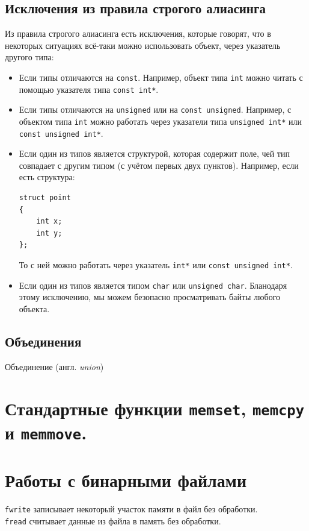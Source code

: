 \documentclass[10pt]{article}
\begin{document}
\subsection*{Исключения из правила строгого алиасинга}
Из правила строгого алиасинга есть исключения, которые говорят, что в некоторых ситуациях всё-таки можно использовать объект, через указатель другого типа:
\begin{itemize}
\item Если типы отличаются на \texttt{const}. Например, объект типа \texttt{int} можно читать с помощью указателя типа \texttt{const int*}. 

\item Если типы отличаются на \texttt{unsigned} или на \texttt{const unsigned}. Например, с объектом типа \texttt{int} можно работать через указатели типа \texttt{unsigned int*} или \texttt{const unsigned int*}. 

\item Если один из типов является структурой, которая содержит поле, чей тип совпадает с другим типом (с учётом первых двух пунктов). Например, если есть структура:
 \begin{lstlisting}
struct point
{
	int x;
	int y;
};
\end{lstlisting}
То с ней можно работать через указатель \texttt{int*} или \texttt{const unsigned int*}.

\item Если один из типов является типом \texttt{char} или \texttt{unsigned char}. Бланодаря этому исключению, мы можем безопасно просматривать байты любого объекта.
\end{itemize}

\subsection*{Объединения}
Объединение (англ. \textit{union})


\newpage
\section*{Стандартные функции \texttt{memset}, \texttt{memcpy} и \texttt{memmove}.}




\newpage
\section*{Работы с бинарными файлами}
\texttt{fwrite} записывает некоторый участок памяти в файл без обработки. \\
\texttt{fread} считывает данные из файла в память без обработки.
\end{document}
